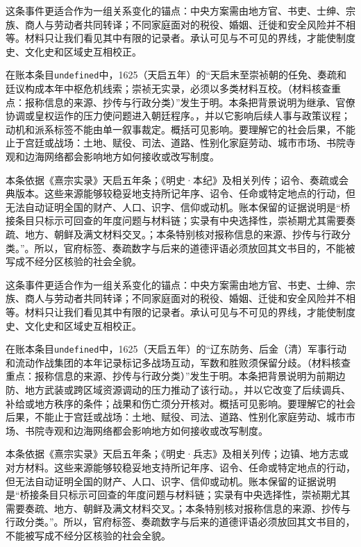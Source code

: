 这条事件更适合作为一组关系变化的锚点：中央方案需由地方官、书吏、士绅、宗族、商人与劳动者共同转译；不同家庭面对的税役、婚姻、迁徙和安全风险并不相等。材料只让我们看见其中有限的记录者。承认可见与不可见的界线，才能使制度史、文化史和区域史互相校正。

在账本条目\texttt{undefined}中，1625（天启五年）的“天启末至崇祯朝的任免、奏疏和廷议构成本年中枢危机线索；崇祯无实录，必须以多类材料互校。（材料核查重点：报称信息的来源、抄传与行政分类）”发生于明。本条把背景说明为继承、官僚协调或皇权运作的压力使问题进入朝廷程序。，并以它影响后续人事与政策议程；动机和派系标签不能由单一叙事裁定。概括可见影响。要理解它的社会后果，不能止于宫廷或战场：土地、赋役、司法、道路、性别化家庭劳动、城市市场、书院寺观和边海网络都会影响地方如何接收或改写制度。

本条依据《熹宗实录》天启五年条；《明史·本纪》及相关列传；诏令、奏疏或会典版本。这些来源能够较稳妥地支持所记年序、诏令、任命或特定地点的行动，但无法自动证明全国的财产、人口、识字、信仰或动机。账本保留的证据说明是“桥接条目只标示可回查的年度问题与材料链；实录有中央选择性，崇祯期尤其需要奏疏、地方、朝鲜及满文材料交叉。；本条特别核对报称信息的来源、抄传与行政分类。”。所以，官府标签、奏疏数字与后来的道德评语必须放回其文书目的，不能被写成不经分区核验的社会全貌。

这条事件更适合作为一组关系变化的锚点：中央方案需由地方官、书吏、士绅、宗族、商人与劳动者共同转译；不同家庭面对的税役、婚姻、迁徙和安全风险并不相等。材料只让我们看见其中有限的记录者。承认可见与不可见的界线，才能使制度史、文化史和区域史互相校正。

在账本条目\texttt{undefined}中，1625（天启五年）的“辽东防务、后金（清）军事行动和流动作战集团的本年记录标记多战场互动，军数和胜败须保留分歧。（材料核查重点：报称信息的来源、抄传与行政分类）”发生于明。本条把背景说明为前期边防、地方武装或跨区域资源调动的压力推动了该行动。，并以它改变了后续调兵、补给或地方秩序的条件；战果和伤亡须分开核对。概括可见影响。要理解它的社会后果，不能止于宫廷或战场：土地、赋役、司法、道路、性别化家庭劳动、城市市场、书院寺观和边海网络都会影响地方如何接收或改写制度。

本条依据《熹宗实录》天启五年条；《明史·兵志》及相关列传；边镇、地方志或对方材料。这些来源能够较稳妥地支持所记年序、诏令、任命或特定地点的行动，但无法自动证明全国的财产、人口、识字、信仰或动机。账本保留的证据说明是“桥接条目只标示可回查的年度问题与材料链；实录有中央选择性，崇祯期尤其需要奏疏、地方、朝鲜及满文材料交叉。；本条特别核对报称信息的来源、抄传与行政分类。”。所以，官府标签、奏疏数字与后来的道德评语必须放回其文书目的，不能被写成不经分区核验的社会全貌。

